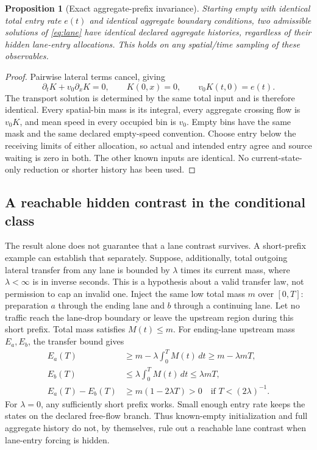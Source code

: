 \documentclass[11pt]{article}
\newtheorem{proposition}{Proposition}
\begin{document}
\begin{proposition}[Exact aggregate-prefix invariance]
Starting empty with identical total entry rate $e(t)$ and identical aggregate
boundary conditions, two admissible solutions of \eqref{eq:lane} have identical
declared aggregate histories, regardless of their hidden lane-entry allocations.
This holds on any spatial/time sampling of these observables.
\end{proposition}
\begin{proof}
Pairwise lateral terms cancel, giving
\begin{equation}
\partial_tK+v_0\partial_xK=0,\qquad
K(0,x)=0,\qquad v_0K(t,0)=e(t).
\label{eq:aggregate}
\end{equation}
The transport solution is determined by the same total input and is therefore
identical. Every spatial-bin mass is its integral, every aggregate crossing
flow is $v_0K$, and mean speed in every occupied bin is $v_0$. Empty bins have
the same mask and the same declared empty-speed convention. Choose entry below
the receiving limits of either allocation, so actual and intended entry agree
and source waiting is zero in both. The other known inputs are identical.
No current-state-only reduction or shorter history has been used.
\end{proof}

\subsection*{A reachable hidden contrast in the conditional class}
The result alone does not guarantee that a lane contrast survives. A short-prefix
example can establish that separately. Suppose, additionally, total outgoing
lateral transfer from any lane is bounded by $\lambda$ times its current mass,
where $\lambda<\infty$ is in inverse seconds. This is a hypothesis about a
valid transfer law, not permission to cap an invalid one. Inject the same low
total mass $m$ over $[0,T]$: preparation $a$ through the ending lane and $b$
through a continuing lane. Let no traffic reach the lane-drop boundary or leave
the upstream region during this short prefix. Total mass satisfies $M(t)\leq m$.
For ending-lane upstream mass $E_a,E_b$, the transfer bound gives
\begin{align}
E_a(T)&\geq m-\lambda\int_0^T M(t)\,dt\geq m-\lambda mT,\\
E_b(T)&\leq \lambda\int_0^T M(t)\,dt\leq\lambda mT,\\
E_a(T)-E_b(T)&\geq m(1-2\lambda T)>0\quad\text{if }T<(2\lambda)^{-1}.
\label{eq:contrast}
\end{align}
For $\lambda=0$, any sufficiently short prefix works. Small enough entry rate
keeps the states on the declared free-flow branch. Thus known-empty initialization
and full aggregate history do not, by themselves, rule out a reachable lane
contrast when lane-entry forcing is hidden.
\end{document}
